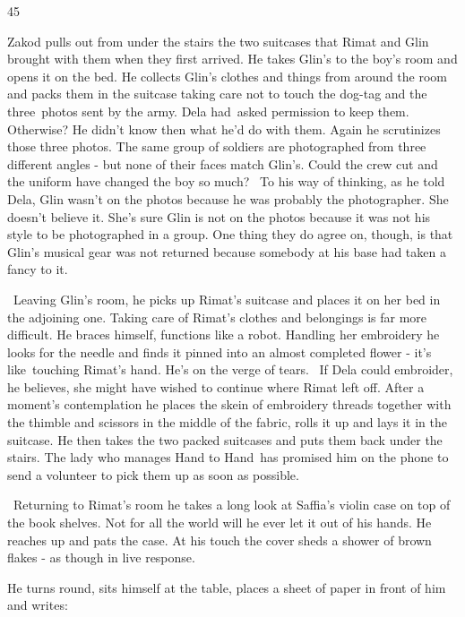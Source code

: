 \documentclass[letterpaper]{article}
\begin{document}
\bigskip

45 

Zakod pulls out from under the stairs the two suitcases that Rimat and Glin brought with them when they first arrived.
He takes Glin's to the boy's room and opens it on the bed. He collects Glin's clothes and things from around the room
and packs them in the suitcase taking care not to touch the dog-tag and the three~photos sent by the army. Dela
had~asked permission to keep them. Otherwise? He didn't know then what he'd do with them. Again he scrutinizes those
three photos. The same group of soldiers are photographed from three different angles - but none of their faces match
Glin's. Could the crew cut and the uniform have changed the boy so much? \ To his way of thinking, as he told Dela,
Glin wasn't on the photos because he was probably the photographer. She doesn't believe it. She's sure Glin is not on
the photos because it was not his style to be photographed in a group. One thing they do agree on, though, is that
Glin's musical gear was not returned because somebody at his base had taken a fancy to it. 

\ Leaving Glin's room, he picks up Rimat's suitcase and places it on her bed in the adjoining one. Taking care of
Rimat's clothes and belongings is far more difficult. He braces himself, functions like a robot. Handling her
embroidery he looks for the needle and finds it pinned into an almost completed flower - it's like~touching Rimat's
hand. He's on the verge of tears\textcolor[rgb]{0.0,0.4392157,0.7529412}{.} \ If Dela could embroider, he believes, she
might have wished to continue where Rimat left off. After a moment's contemplation he places the skein of embroidery
threads together with the thimble and scissors in the middle of the fabric, rolls it up and lays it in the suitcase. He
then takes the two packed suitcases and puts them back under the stairs. The lady who manages {\textquotedbl}Hand to
Hand{\textquotedbl}~has promised him on the phone to send a volunteer to pick them up as soon as possible. 

\ Returning to Rimat's room he takes a long look at Saffia's violin case on top of the book shelves. Not for
all\textcolor[rgb]{0.0,0.4392157,0.7529412}{ }the world will he ever let it out of his hands. He reaches up and pats
the case. At his touch the cover sheds a shower of brown flakes - as though in live response.

He turns round, sits himself at the table, places a sheet of paper in front of him and writes:
\end{document}
